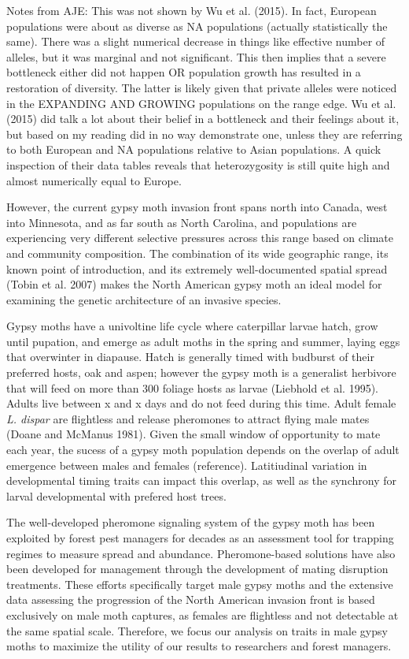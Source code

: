 \documentclass[fleqn,11pt]{wlpeerj}
\begin{document}
Notes from AJE: This was not shown by Wu et al. (2015). In fact, European populations
were about as diverse as NA populations (actually statistically 
the same). There was a slight numerical decrease in things like effective number of alleles, but it was marginal and not significant. 
This then implies that a severe bottleneck either did not happen OR population growth has resulted in a restoration of diversity. The
latter is likely given that private alleles were noticed in the EXPANDING AND GROWING populations on the range edge. 
Wu et al. (2015) did talk a lot about their belief in a bottleneck and their feelings about it, but based on my reading did
in no way demonstrate one, unless they are referring to both European and NA populations relative to Asian populations. A quick inspection
of their data tables reveals that heterozygosity is still quite high and almost numerically equal to Europe. 

However, the current gypsy moth invasion front spans north into Canada, west into Minnesota, and as far south as North Carolina, and populations are experiencing very different selective pressures across this range based on climate and community composition. The combination of its wide geographic range, its known point of introduction, and its extremely well-documented spatial spread (Tobin et al. 2007) makes the North American gypsy moth an ideal model for examining the genetic architecture of an invasive species.

Gypsy moths have a univoltine life cycle where caterpillar larvae hatch, grow until pupation, and emerge as adult moths in the spring and summer, laying eggs that overwinter in diapause. Hatch is generally timed with budburst of their preferred hosts, oak and aspen; however the gypsy moth is a generalist herbivore that will feed on more than 300 foliage hosts as larvae (Liebhold et al. 1995). Adults live between x and x days and do not feed during this time. Adult female \textit{L. dispar} are flightless and release pheromones to attract flying male mates (Doane and McManus 1981). Given the small window of opportunity to mate each year, the sucess of a gypsy moth population depends on the overlap of adult emergence between males and females (reference). Latitiudinal variation in developmental timing traits can impact this overlap, as well as the synchrony for larval developmental with prefered host trees.

The well-developed pheromone signaling system of the gypsy moth has been exploited by forest pest managers for decades as an assessment tool for trapping regimes to measure spread and abundance. Pheromone-based solutions have also been developed for management through the development of mating disruption treatments. These efforts specifically target male gypsy moths and the extensive data assessing the progression of the North American invasion front is based exclusively on male moth captures, as females are flightless and not detectable at the same spatial scale. Therefore, we focus our analysis on traits in male gypsy moths to maximize the utility of our results to researchers and forest managers.
\end{document}
